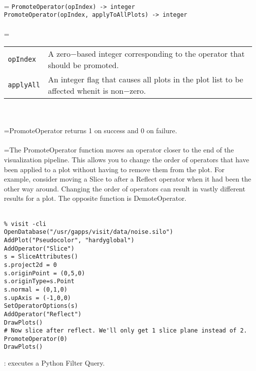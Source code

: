 \documentclass[10pt,a4paper]{report}
\begin{document}
 \\ 
\hangindent=\parindent 
\verb!PromoteOperator(opIndex) -> integer!\\ 
\verb!PromoteOperator(opIndex, applyToAllPlots) -> integer!\\ [-3mm]

 \\ 
\hangindent=\parindent 
\begin{tabular}{lp{9cm}}
\verb!opIndex! & A zero$-$based integer corresponding to the operator that should be promoted. \\
\verb!applyAll! & An integer flag that causes all plots in the plot list to be affected whenit is non$-$zero. \\
\end{tabular} \\[-2mm]


 \\ 
\hangindent=\parindent PromoteOperator returns 1 on success and 0 on failure. \\[-3mm] 

 \\ 
\hangindent=\parindent The PromoteOperator function moves an operator closer to the end of the visualization pipeline. This allows you to change the order of operators that have been applied to a plot without having to remove them from the plot. For example, consider moving a Slice to after a Reflect operator when it had been the other way around. Changing the order of operators can result in vastly different results for a plot. The opposite function is DemoteOperator. \\[-3mm] 

\\[-6mm]
\begin{verbatim}% visit -cli
OpenDatabase("/usr/gapps/visit/data/noise.silo")
AddPlot("Pseudocolor", "hardyglobal")
AddOperator("Slice")
s = SliceAttributes()
s.project2d = 0
s.originPoint = (0,5,0)
s.originType=s.Point
s.normal = (0,1,0)
s.upAxis = (-1,0,0)
SetOperatorOptions(s)
AddOperator("Reflect")
DrawPlots()
# Now slice after reflect. We'll only get 1 slice plane instead of 2.
PromoteOperator(0)
DrawPlots()
\end{verbatim}
\newpage


{}
: executes a Python Filter Query.\\[-3mm]
\end{document}

